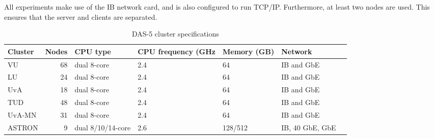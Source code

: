 All experiments make use of the IB network card, and is also configured to run TCP/IP.
Furthermore, at least two nodes are used.
This ensures that the server and clients are separated.

\begin{table}
    \centering
    \begin{tabular}{lrlllll}
        \toprule
        \textbf{Cluster} & \textbf{Nodes} & \textbf{CPU type} & \textbf{CPU frequency (GHz} & \textbf{Memory (GB)} & \textbf{Network} \\
        \midrule
        VU & 68 & dual 8-core & 2.4 & 64 & IB and GbE \\
        LU & 24 & dual 8-core & 2.4 & 64 & IB and GbE \\
        UvA & 18 & dual 8-core & 2.4 & 64 & IB and GbE \\
        TUD & 48 & dual 8-core & 2.4 & 64 & IB and GbE \\
        UvA-MN & 31 & dual 8-core & 2.4 & 64 & IB and GbE \\
        ASTRON & 9 & dual 8/10/14-core & 2.6 & 128/512 & IB, 40 GbE, GbE \\
        \bottomrule
    \end{tabular}
    \caption{DAS-5 cluster specifications}
    \label{tab:das5}
\end{table}






